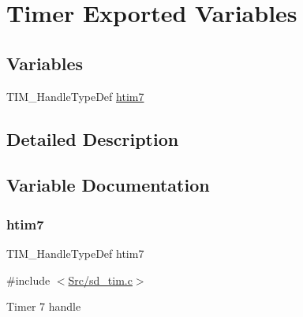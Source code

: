 \hypertarget{group___s_d___t_i_m___exported___variables}{}\section{Timer Exported Variables}
\label{group___s_d___t_i_m___exported___variables}
\subsection*{Variables}
\begin{DoxyCompactItemize}
\item 
T\+I\+M\+\_\+\+Handle\+Type\+Def \mbox{\hyperlink{group___s_d___t_i_m___exported___variables_gabb71bf3ee68e2a051fbeec6c3ab3012d}{htim7}}
\end{DoxyCompactItemize}


\subsection{Detailed Description}


\subsection{Variable Documentation}
\mbox{\label{group___s_d___t_i_m___exported___variables_gabb71bf3ee68e2a051fbeec6c3ab3012d}} 
\subsubsection{\texorpdfstring{htim7}{htim7}}
{\footnotesize\ttfamily T\+I\+M\+\_\+\+Handle\+Type\+Def htim7}



{\ttfamily \#include $<$\mbox{\hyperlink{sd__tim_8c}{Src/sd\+\_\+tim.\+c}}$>$}

Timer 7 handle 